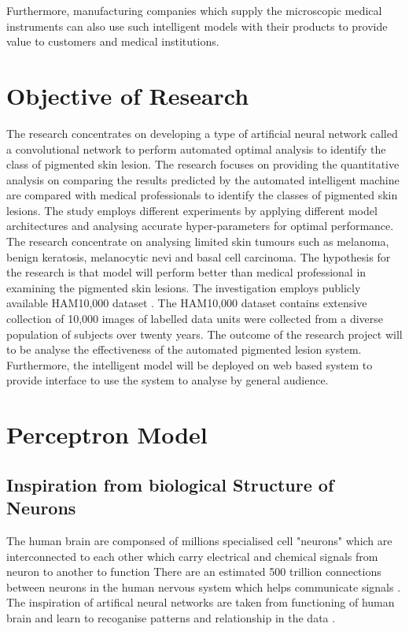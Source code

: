 Furthermore, manufacturing companies which supply the microscopic medical instruments can also use such intelligent models with their products to provide value to customers and medical institutions.

\section{Objective of Research}
The research concentrates on developing a type of artificial neural network called a convolutional network to perform automated optimal analysis to identify the class of pigmented skin lesion. 
The research focuses on providing the quantitative analysis on comparing the results predicted by the automated intelligent machine are compared with medical professionals to identify the classes of pigmented skin lesions. The study employs different experiments by applying different model architectures and analysing accurate hyper-parameters for optimal performance. 
The research concentrate on analysing limited skin tumours such as melanoma, 
benign keratosis, melanocytic nevi and basal cell carcinoma. The hypothesis for the research is that model will perform 
better than medical professional in examining the pigmented skin lesions. The investigation employs publicly available HAM10,000 dataset \citep*{DVN/DBW86T_2018}. 
The HAM10,000 dataset contains extensive collection of 10,000 images of labelled data units were collected from a diverse population of subjects over twenty years.
The outcome of the research project will to be analyse the effectiveness of the automated pigmented 
lesion system. Furthermore, the intelligent model will be deployed on web based system to provide 
interface to use the system to analyse by general audience.
\pagebreak
\pagebreak

\section{Perceptron Model}
\subsection{Inspiration from biological Structure of Neurons}
The human brain are componsed of millions specialised cell "neurons" which are interconnected to each other which carry electrical and chemical signals from neuron to another to function
There are an estimated 500 trillion connections between neurons in the human nervous system which helps communicate signals \citep*{patterson2017deep}.
The inspiration of artifical neural networks are taken from functioning of human brain and learn to recoganise patterns and relationship in the data \citep*{AGATONOVICKUSTRIN2000717}. 
